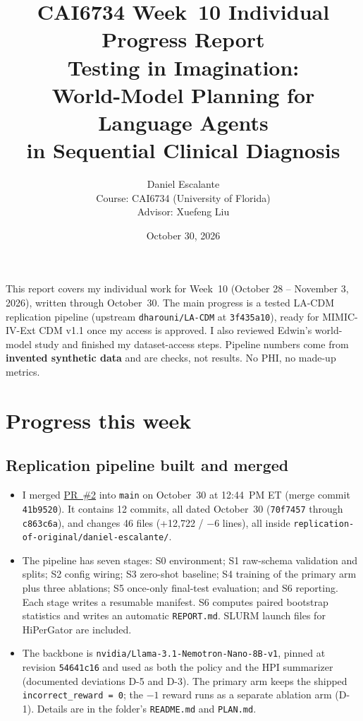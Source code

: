 \documentclass[11pt,letterpaper]{article}
\title{\textbf{CAI6734 Week~10 Individual Progress Report}\\[0.35em]
\large Testing in Imagination:\\
World-Model Planning for Language Agents\\
in Sequential Clinical Diagnosis}
\author{Daniel Escalante\\[0.4em]
\small Course: CAI6734 (University of Florida)\\
Advisor: Xuefeng Liu}
\date{October 30, 2026}
\begin{document}
\maketitle
\thispagestyle{empty}

\noindent
This report covers my individual work for Week~10 (October 28 -- November 3, 2026), written through October~30. The main progress is a tested LA-CDM replication pipeline (upstream \texttt{dharouni/LA-CDM} at \texttt{3f435a10}), ready for MIMIC-IV-Ext CDM v1.1 once my access is approved. I also reviewed Edwin's world-model study and finished my dataset-access steps. Pipeline numbers come from \textbf{invented synthetic data} and are checks, not results. No PHI, no made-up metrics.

\section{Progress this week}

\subsection{Replication pipeline built and merged}
\begin{itemize}
  \item I merged \href{https://github.com/scalinity/testing-in-imagination/pull/2}{PR~\#2} into \texttt{main} on October~30 at 12:44~PM ET (merge commit \texttt{41b9520}). It contains 12 commits, all dated October~30 (\texttt{70f7457} through \texttt{c863c6a}), and changes 46 files (+12,722 / $-$6 lines), all inside \texttt{replication-of-original/daniel-escalante/}.
  \item The pipeline has seven stages: S0 environment; S1 raw-schema validation and splits; S2 config wiring; S3 zero-shot baseline; S4 training of the primary arm plus three ablations; S5 once-only final-test evaluation; and S6 reporting. Each stage writes a resumable manifest. S6 computes paired bootstrap statistics and writes an automatic \texttt{REPORT.md}. SLURM launch files for HiPerGator are included.
  \item The backbone is \texttt{nvidia/Llama-3.1-Nemotron-Nano-8B-v1}, pinned at revision \texttt{54641c16} and used as both the policy and the HPI summarizer (documented deviations D-5 and D-3). The primary arm keeps the shipped \texttt{incorrect\_reward = 0}; the $-1$ reward runs as a separate ablation arm (D-1). Details are in the folder's \texttt{README.md} and \texttt{PLAN.md}.
\end{itemize}
\end{document}
